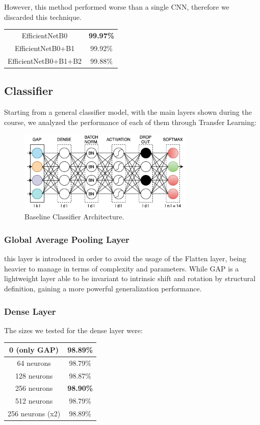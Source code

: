 \documentclass[conference,compsoc]{IEEEtran}
\begin{document}
However, this method performed worse than a single CNN, therefore we discarded this technique.

\begin{center}
\begin{tabular}{ c c }
\hline\hline
 EfficientNetB0 & \textbf{99.97\%}  \\  
 EfficientNetB0+B1 & 99.92\%  \\
 EfficientNetB0+B1+B2 & 99.88\% \\
\hline\hline
\end{tabular}
\end{center}

\subsection{Classifier}
Starting from a general classifier model, with the main layers shown during the course, we analyzed the performance of each of them through Transfer Learning:

\begin{figure}[h!]
\centering
\includegraphics[width=3.3in]{img/classifier.png}
\caption{Baseline Classifier Architecture.}
\label{fig_sim}
\end{figure}

\subsubsection{Global Average Pooling Layer} this layer is introduced in order to avoid the usage of the Flatten layer, being heavier to manage in terms of complexity and parameters. While GAP is a lightweight layer able to be invariant to intrinsic shift and rotation by structural definition, gaining a more powerful generalization performance.

\subsubsection{Dense Layer} The sizes we tested for the dense layer were:
\begin{center}
\begin{tabular}{ c c }
\hline\hline
 0 (only GAP) & 98.89\% \\ 
\hline
 64 neurons & 98.79\%  \\  
 128 neurons & 98.87\%  \\
 256 neurons & \textbf{98.90\%} \\
 512 neurons & 98.79\%\\
\hline
 256 neurons (x2) & 98.89\%  \\  
\hline\hline
\end{tabular}
\end{center}
\end{document}
